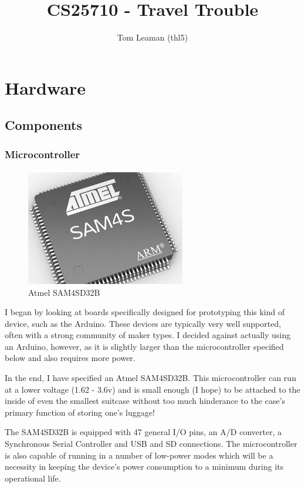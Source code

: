 \documentclass[a4paper, twoside]{article}
\title{CS25710 - Travel Trouble}
\author{Tom Leaman (thl5)}
\begin{document}
\maketitle
\newpage

\section{Hardware}

\subsection{Components}

\subsubsection{Microcontroller}
\begin{figure}
	\vspace{-18pt}
	\begin{center}
		\includegraphics[scale=0.25]{images/atmel_sam4sd32.jpg}
	\end{center}
	\caption{Atmel SAM4SD32B}
\end{figure}

I began by looking at boards specifically designed for prototyping this kind of
device, such as the Arduino. These devices are typically very well supported,
often with a strong community of maker types. I decided against actually using
an Arduino, however, as it is slightly larger than the microcontroller specified
below and also requires more power.

In the end, I have specified an Atmel SAM4SD32B. This microcontroller can run at
a lower voltage (1.62 - 3.6v) and is small enough (I hope) to be attached to the
inside of even the smallest suitcase without too much hinderance to the case's
primary function of storing one's luggage!

The SAM4SD32B is equipped with 47 general I/O pins, an A/D converter, a
Synchronous Serial Controller and USB and SD connections. The microcontroller is
also capable of running in a number of low-power modes which will be a necessity
in keeping the device's power consumption to a minimum during its operational
life.
\end{document}
